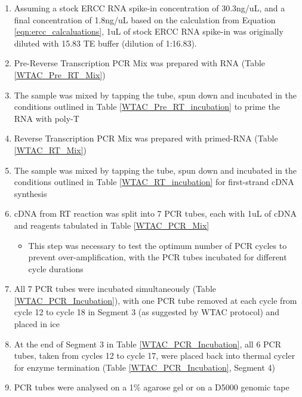 \begin{enumerate}
	\item Assuming a stock ERCC RNA spike-in concentration of 30.3ng/uL, and a final concentration of 1.8ng/uL based on the calculation from Equation \ref{eqn:ercc_calcaluations}, 1uL of stock ERCC RNA spike-in was originally diluted with 15.83 TE buffer (dilution of 1:16.83). 
	\item Pre-Reverse Transcription PCR Mix was prepared with RNA (Table \ref{WTAC_Pre_RT_Mix})
	\item The sample was mixed by tapping the tube, spun down and incubated in the conditions outlined in Table \ref{WTAC_Pre_RT_incubation} to prime the RNA with poly-T
	\item Reverse Transcription PCR Mix was prepared with primed-RNA (Table \ref{WTAC_RT_Mix})
	\item The sample was mixed by tapping the tube, spun down and incubated in the conditions outlined in Table \ref{WTAC_RT_incubation} for first-strand cDNA synthesis
	\item cDNA from RT reaction was split into 7 PCR tubes, each with 1uL of cDNA and reagents tabulated in Table \ref{WTAC_PCR_Mix}
		\begin{itemize}
			\item This step was necessary to test the optimum number of PCR cycles to prevent over-amplification, with the PCR tubes incubated for different cycle durations
		\end{itemize}
	\item All 7 PCR tubes were incubated simultaneously (Table \ref{WTAC_PCR_Incubation}), with one PCR tube removed at each cycle from cycle 12 to cycle 18 in Segment 3 (as suggested by WTAC protocol) and placed in ice
	\item At the end of Segment 3 in Table \ref{WTAC_PCR_Incubation}, all 6 PCR tubes, taken from cycles 12 to cycle 17, were placed back into thermal cycler for enzyme termination (Table \ref{WTAC_PCR_Incubation}, Segment 4) 
	\item PCR tubes were analysed on a 1\% agarose gel or on a D5000 genomic tape	
\end{enumerate}
\


